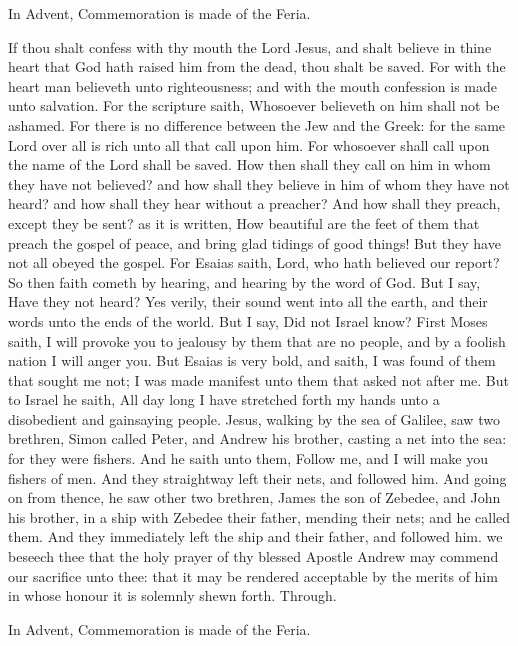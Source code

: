 \begin{rubric}
    In Advent, Commemoration is made of the Feria.
\end{rubric}

 If thou shalt confess with thy mouth the Lord Jesus, and shalt believe in thine heart that God hath raised him from the dead, thou shalt be saved. For with the heart man believeth unto righteousness; and with the mouth confession is made unto salvation. For the scripture saith, Whosoever believeth on him shall not be ashamed. For there is no difference between the Jew and the Greek: for the same Lord over all is rich unto all that call upon him. For whosoever shall call upon the name of the Lord shall be saved. How then shall they call on him in whom they have not believed? and how shall they believe in him of whom they have not heard? and how shall they hear without a preacher? And how shall they preach, except they be sent? as it is written, How beautiful are the feet of them that preach the gospel of peace, and bring glad tidings of good things! But they have not all obeyed the gospel. For Esaias saith, Lord, who hath believed our report? So then faith cometh by hearing, and hearing by the word of God. But I say, Have they not heard? Yes verily, their sound went into all the earth, and their words unto the ends of the world. But I say, Did not Israel know? First Moses saith, I will provoke you to jealousy by them that are no people, and by a foolish nation I will anger you. But Esaias is very bold, and saith, I was found of them that sought me not; I was made manifest unto them that asked not after me. But to Israel he saith, All day long I have stretched forth my hands unto a disobedient and gainsaying people.
 Jesus, walking by the sea of Galilee, saw two brethren, Simon called Peter, and Andrew his brother, casting a net into the sea: for they were fishers. And he saith unto them, Follow me, and I will make you fishers of men. And they straightway left their nets, and followed him. And going on from thence, he saw other two brethren, James the son of Zebedee, and John his brother, in a ship with Zebedee their father, mending their nets; and he called them. And they immediately left the ship and their father, and followed him.
\secret
{} we beseech thee that the holy prayer of thy blessed Apostle Andrew may commend our sacrifice unto thee: that it may be rendered acceptable by the merits of him in whose honour it is solemnly shewn forth. Through.
\begin{rubric}
    In Advent, Commemoration is made of the Feria.
\end{rubric}


